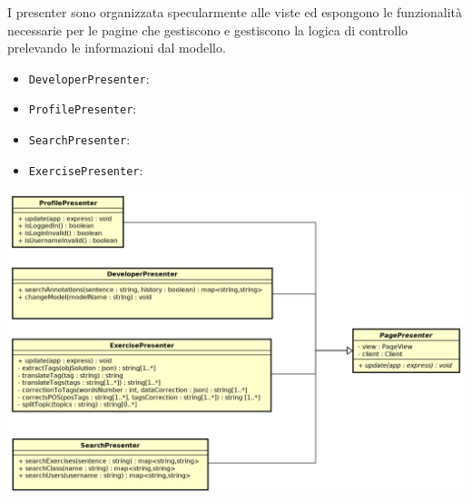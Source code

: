 I presenter sono organizzata specularmente alle viste ed espongono le funzionalità necessarie per le pagine che gestiscono e gestiscono la logica di controllo prelevando le informazioni dal modello.
\begin{itemize}
	\item \texttt{DeveloperPresenter}:  
	\item \texttt{ProfilePresenter}: 
	\item \texttt{SearchPresenter}: 
	\item \texttt{ExercisePresenter}: 
\end{itemize}

\includegraphics[scale=0.53]{images/Presenter.png}

